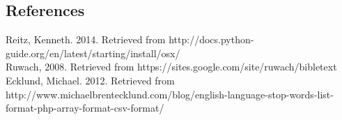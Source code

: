 \documentclass[10pt]{article}
\begin{document}
\subsection*{References}
Reitz, Kenneth. 2014. Retrieved from http://docs.python-guide.org/en/latest/starting/install/osx/\\
Ruwach, 2008. Retrieved from https://sites.google.com/site/ruwach/bibletext\\
Ecklund, Michael. 2012. Retrieved from http://www.michaelbrentecklund.com/blog/english-language-stop-words-list-format-php-array-format-csv-format/
\end{document}
